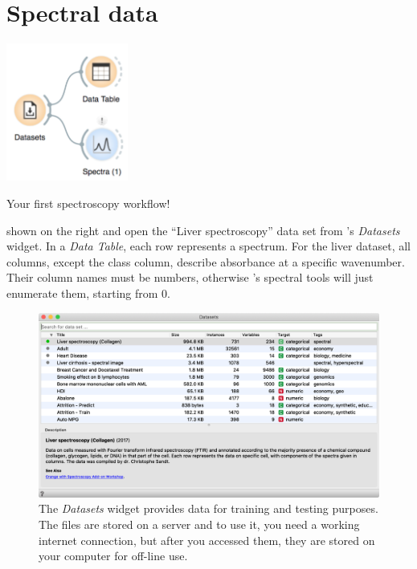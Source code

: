 \chapter{Spectral data}
\label{ch:spectral-data}

\begin{marginfigure}
  \includegraphics[width=40mm]{spectral-data-fig1.png}%
  \caption{Your first spectroscopy workflow!}
  \label{fig:spectral-data-fig1}
\end{marginfigure}

 shown on the right and open the “Liver spectroscopy” data set from \mutation’s \textit{Datasets} widget.
In a \textit{Data Table}, each row represents a spectrum. For the liver dataset, all columns, except the class column, describe absorbance at a specific wavenumber. Their column names must be numbers, otherwise \mutation’s spectral tools will just enumerate them, starting from 0.

\begin{figure}[h]
  \centering
  \includegraphics[width=\linewidth]{spectral-data-fig2.png}%
  \caption{The \textit{Datasets} widget provides data for training and testing purposes. The files are stored on a server and to use it, you need a working internet connection, but after you accessed them, they are stored on your computer for off-line use.}
  \label{fig:spectral-data-fig2}
\end{figure}

